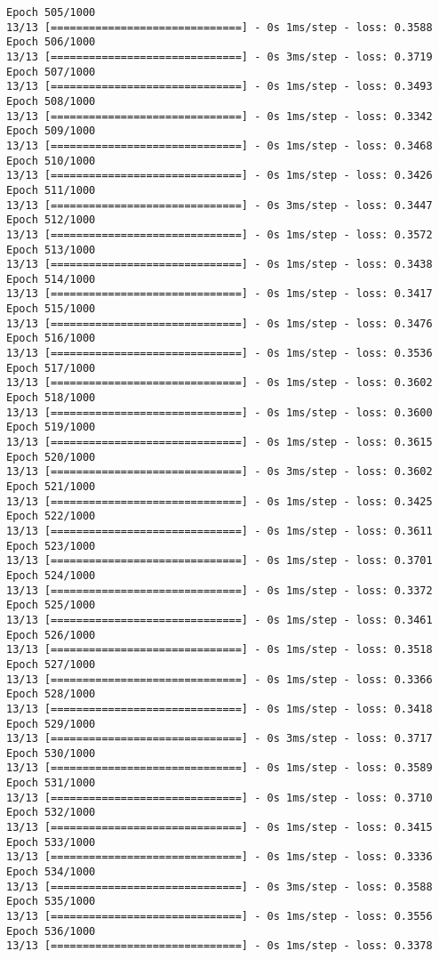 \documentclass[11pt]{article}
\begin{document}
\begin{Verbatim}[commandchars=\\\{\}]
Epoch 505/1000
13/13 [==============================] - 0s 1ms/step - loss: 0.3588
Epoch 506/1000
13/13 [==============================] - 0s 3ms/step - loss: 0.3719
Epoch 507/1000
13/13 [==============================] - 0s 1ms/step - loss: 0.3493
Epoch 508/1000
13/13 [==============================] - 0s 1ms/step - loss: 0.3342
Epoch 509/1000
13/13 [==============================] - 0s 1ms/step - loss: 0.3468
Epoch 510/1000
13/13 [==============================] - 0s 1ms/step - loss: 0.3426
Epoch 511/1000
13/13 [==============================] - 0s 3ms/step - loss: 0.3447
Epoch 512/1000
13/13 [==============================] - 0s 1ms/step - loss: 0.3572
Epoch 513/1000
13/13 [==============================] - 0s 1ms/step - loss: 0.3438
Epoch 514/1000
13/13 [==============================] - 0s 1ms/step - loss: 0.3417
Epoch 515/1000
13/13 [==============================] - 0s 1ms/step - loss: 0.3476
Epoch 516/1000
13/13 [==============================] - 0s 1ms/step - loss: 0.3536
Epoch 517/1000
13/13 [==============================] - 0s 1ms/step - loss: 0.3602
Epoch 518/1000
13/13 [==============================] - 0s 1ms/step - loss: 0.3600
Epoch 519/1000
13/13 [==============================] - 0s 1ms/step - loss: 0.3615
Epoch 520/1000
13/13 [==============================] - 0s 3ms/step - loss: 0.3602
Epoch 521/1000
13/13 [==============================] - 0s 1ms/step - loss: 0.3425
Epoch 522/1000
13/13 [==============================] - 0s 1ms/step - loss: 0.3611
Epoch 523/1000
13/13 [==============================] - 0s 1ms/step - loss: 0.3701
Epoch 524/1000
13/13 [==============================] - 0s 1ms/step - loss: 0.3372
Epoch 525/1000
13/13 [==============================] - 0s 1ms/step - loss: 0.3461
Epoch 526/1000
13/13 [==============================] - 0s 1ms/step - loss: 0.3518
Epoch 527/1000
13/13 [==============================] - 0s 1ms/step - loss: 0.3366
Epoch 528/1000
13/13 [==============================] - 0s 1ms/step - loss: 0.3418
Epoch 529/1000
13/13 [==============================] - 0s 3ms/step - loss: 0.3717
Epoch 530/1000
13/13 [==============================] - 0s 1ms/step - loss: 0.3589
Epoch 531/1000
13/13 [==============================] - 0s 1ms/step - loss: 0.3710
Epoch 532/1000
13/13 [==============================] - 0s 1ms/step - loss: 0.3415
Epoch 533/1000
13/13 [==============================] - 0s 1ms/step - loss: 0.3336
Epoch 534/1000
13/13 [==============================] - 0s 3ms/step - loss: 0.3588
Epoch 535/1000
13/13 [==============================] - 0s 1ms/step - loss: 0.3556
Epoch 536/1000
13/13 [==============================] - 0s 1ms/step - loss: 0.3378

\end{Verbatim}
\end{document}
